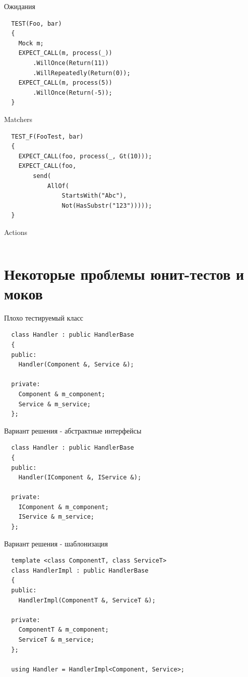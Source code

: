 \documentclass[unknownkeysallowed,xcolor=table]{beamer}
\begin{document}
\begin{frame}[fragile]{Ожидания}
  \begin{lstlisting}
  TEST(Foo, bar)
  {
    Mock m;
    EXPECT_CALL(m, process(_))
        .WillOnce(Return(11))
        .WillRepeatedly(Return(0));
    EXPECT_CALL(m, process(5))
        .WillOnce(Return(-5));
  }
  \end{lstlisting}
\end{frame}

\begin{frame}[fragile]{Matchers}
  \begin{lstlisting}
  TEST_F(FooTest, bar)
  {
    EXPECT_CALL(foo, process(_, Gt(10)));
    EXPECT_CALL(foo,
        send(
            AllOf(
                StartsWith("Abc"),
                Not(HasSubstr("123")))));
  }
  \end{lstlisting}
\end{frame}

\begin{frame}[fragile]{Actions}
  \begin{lstlisting}
  \end{lstlisting}
\end{frame}

\section{Некоторые проблемы юнит-тестов и моков}

\begin{frame}[fragile]{Плохо тестируемый класс}
  \begin{lstlisting}
  class Handler : public HandlerBase
  {
  public:
    Handler(Component &, Service &);

  private:
    Component & m_component;
    Service & m_service;
  };
  \end{lstlisting}
\end{frame}

\begin{frame}[fragile]{Вариант решения - абстрактные интерфейсы}
  \begin{lstlisting}
  class Handler : public HandlerBase
  {
  public:
    Handler(IComponent &, IService &);

  private:
    IComponent & m_component;
    IService & m_service;
  };
  \end{lstlisting}
\end{frame}

\begin{frame}[fragile]{Вариант решения - шаблонизация}
  \begin{lstlisting}
  template <class ComponentT, class ServiceT>
  class HandlerImpl : public HandlerBase
  {
  public:
    HandlerImpl(ComponentT &, ServiceT &);

  private:
    ComponentT & m_component;
    ServiceT & m_service;
  };

  using Handler = HandlerImpl<Component, Service>;
  \end{lstlisting}
\end{frame}
\end{document}
